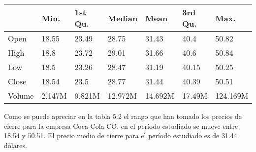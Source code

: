 \documentclass[]{article}
\begin{document}
\begin{table}[H]
\centering\begingroup\fontsize{10}{12}\selectfont

\begin{tabular}{l|l|l|l|l|l|l}
\hline
  & Min. & 1st Qu. & Median & Mean & 3rd Qu. & Max.\\
\hline
Open & 18.55 & 23.49 & 28.75 & 31.43 & 40.4 & 50.82\\
\hline
High & 18.8 & 23.72 & 29.01 & 31.66 & 40.6 & 50.84\\
\hline
Low & 18.5 & 23.26 & 28.47 & 31.19 & 40.15 & 50.25\\
\hline
Close & 18.54 & 23.5 & 28.77 & 31.44 & 40.39 & 50.51\\
\hline
Volume & 2.147M & 9.821M & 12.972M & 14.692M & 17.49M & 124.169M\\
\hline
\end{tabular}\endgroup{}
\end{table}

\setlength\parskip{5ex}
\justifying

Como se puede apreciar en la tabla 5.2 el rango que han tomado los
precios de cierre para la empresa Coca-Cola CO. en el período estudiado
se mueve entre 18.54 y 50.51. El precio medio de cierre para el período
estudiado es de 31.44 dólares.
\end{document}
